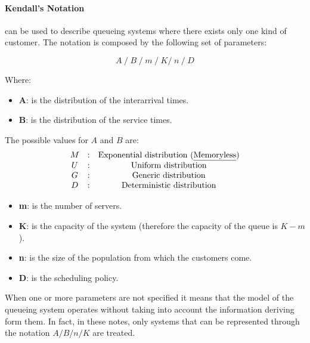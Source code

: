\documentclass[12pt,a4paper]{article}
\begin{document}
\paragraph{Kendall's Notation} can be used to describe queueing systems where there exists only one kind of customer. 
The notation is composed by the following set of parameters:
\begin{Large}
$$
A \hspace{3pt} / \hspace{3pt} B \hspace{3pt} / \hspace{3pt} m \hspace{3pt} / \hspace{3pt} K
/ \hspace{3pt} n \hspace{3pt} / \hspace{3pt} D
$$
\end{Large}

\noindent
Where:
\begin{itemize}
\item \textbf{A}: is the distribution of the interarrival times.
\item \textbf{B}: is the distribution of the service times.
\end{itemize}
The possible values for $A$ and $B$ are:
$$
\begin{matrix}
M & : & \textrm{Exponential distribution (\underline{Memoryless})} \cr
U & : & \textrm{Uniform distribution} \cr
G & : & \textrm{Generic distribution} \cr
D & : & \textrm{Deterministic distribution}
\end{matrix}
$$
\begin{itemize}
\item \textbf{m}: is the number of servers.
\item \textbf{K}: is the capacity of the system (therefore the capacity of the queue is $K-m$).
\item \textbf{n}: is the size of the population from which the customers come.
\item \textbf{D}: is the scheduling policy.
\end{itemize}
When one or more parameters are not specified it means that the model of the queueing system operates without taking into account the information deriving form them. In fact, in these notes, only systems that can be represented through the notation
$A/B/n/K$ are treated.
\end{document}
